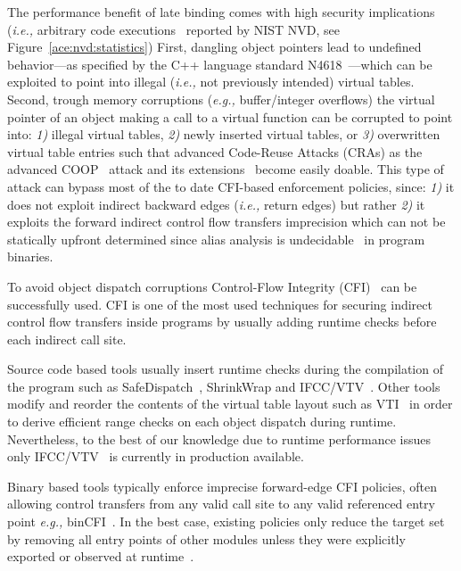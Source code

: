 The performance benefit of late binding comes with high security implications (\textit{i.e.,} arbitrary code executions~\cite{NVD:ACE} reported by NIST NVD, see Figure~\ref{ace:nvd:statistics})
First, dangling object pointers lead to undefined behavior---as specified by the C++ language standard N4618~\cite{N4618}---which can be exploited to point into illegal (\textit{i.e.,} not previously intended) virtual tables.
Second, trough memory corruptions (\textit{e.g.,} buffer/integer overflows) the virtual pointer of an object making a call to a virtual function can be corrupted to point into:
\textit{1)} illegal virtual tables, 
\textit{2)} newly inserted virtual tables, or
\textit{3)} overwritten virtual table entries
such that advanced Code-Reuse Attacks (CRAs) as the advanced COOP~\cite{schuster:coop} attack
and its extensions~\cite{crane:readactor++, crane:readactor++, subversive-c:lettner, ctf:coop, loop:oriented} 
become easily doable. This type of attack can bypass most of the to date CFI-based enforcement policies, since:
\textit{1)} it does not exploit indirect backward edges (\textit{i.e.,} return edges) but rather
\textit{2)} it exploits the forward indirect control flow transfers imprecision which can not be statically upfront 
determined since alias analysis is undecidable~\cite{alias:undecidable} in program binaries.

To avoid object dispatch corruptions Control-Flow Integrity (CFI)~\cite{abadi:cfi2, abadi:cfi} can be successfully used.
CFI is one of the most used techniques for securing indirect control flow transfers inside programs
by usually adding runtime checks before each indirect call site.

Source code based tools usually insert runtime checks during the compilation of 
the program such as SafeDispatch~\cite{safedispatch:jang}, ShrinkWrap \cite{haller:shrinkwrap} and IFCC/VTV~\cite{vtv:tice}.
Other tools modify and reorder the contents of the virtual table layout such as VTI~\cite{bounov:interleaving} 
in order to derive efficient range checks on each object dispatch during runtime. Nevertheless, to the best of our knowledge 
due to runtime performance issues only IFCC/VTV~\cite{vtv:tice} is currently in production available.

Binary based tools typically enforce imprecise forward-edge CFI 
policies, often allowing control transfers from any valid call site 
to any valid referenced entry point \textit{e.g.,} binCFI~\cite{ccfir:zhang, zhang:usenix}. 
In the best case, existing policies only reduce the target set by
removing all entry points of other modules unless they were
explicitly exported or observed at runtime~\cite{payer:dimva}. 


